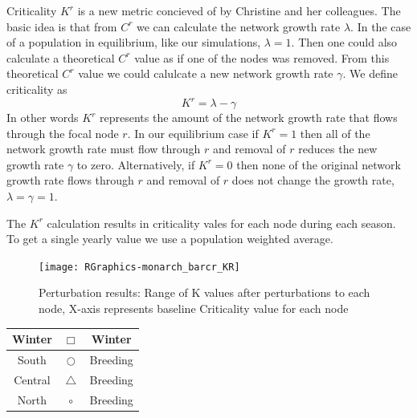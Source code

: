 \documentclass[10pt]{article}
\begin{document}
Criticality $K^r$ is a new metric concieved of by Christine and her colleagues. The basic idea is that from $C^r$ we can calculate the network growth rate $\lambda$. In the case of a population in equilibrium, like our simulations, $\lambda = 1$. Then one could also calculate a theoretical $C^r$ value as if one of the nodes was removed. From this theoretical $C^r$ value we could calulcate a new network growth rate $\gamma$. We define criticality as 
\[K^r = \lambda - \gamma \]
In other words $K^r$ represents the amount of the network growth rate that flows through the focal node $r$. In our equilibrium case if $K^r=1$ then all of the network growth rate must flow through $r$ and removal of $r$ reduces the new growth rate $\gamma$ to zero. Alternatively, if $K^r=0$ then none of the original network growth rate flows through $r$ and removal of $r$ does not change the growth rate, $\lambda=\gamma=1$.

The $K^r$ calculation results in criticality vales for each node during each season. To get a single yearly value we use a population weighted average.



\vspace{-.5cm}
\begin{figure}[H]
\begin{center}
\texttt{[image: RGraphics-monarch\_barcr\_KR]}
\caption{Perturbation results: Range of K values after perturbations to each node, X-axis represents baseline Criticality value for each node}\label{fig:monarch_barcr_KR}
\end{center}
\end{figure}

\vspace{-.5cm}
\begin{tabular}{|c|c|c|}
\hline
{\color{red} Winter} & $\Box$ & Winter \\
\hline
{\color{orange} South} & $\bigcirc$ & Breeding \\
\hline
{\color{blue} Central} & $\triangle$ &  Breeding \\
\hline
{\color{green} North} & $\circ$ & Breeding \\
\hline
\end{tabular}
\end{document}
